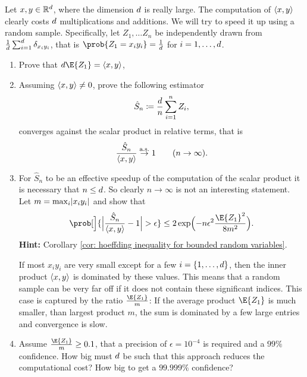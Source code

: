 
\begin{exercise}[subtitle={Randomized linear algebra \Coffeecup}]
    Let \(x,y \in \mathbb{R}^d\), where the dimension \(d\) is really large.
    The computation of \(\langle x,y\rangle\) clearly costs \(d\) multiplications and
    additions. We will try to speed it up using a random sample.
    Specifically, let \(Z_1, \ldots Z_n\) be independently drawn from
    \(\frac1{d}\sum_{i=1}^d \delta_{x_iy_i}\), that is
    \(\prob{Z_1 = x_iy_i} = \frac1\dims\) for \(i=1, \ldots, d\).
    \begin{enumerate}[label=(\alph*), noitemsep]
        \item\label{it: (randomized linear algebra) expectation}
        Prove that \(\dims \E{Z_1} = \scp{x,y}\),

        \item\label{it: (randomized linear algebra) convergence}
        Assuming \(\langle x,y\rangle \neq 0\), prove the following estimator
        \[
            \hat S_n \coloneq \frac{d}{n} \sum_{i=1}^n Z_i,
        \]
        converges against the scalar product in relative terms, that is
        \[
            \frac{\hat S_n}{\langle x,y\rangle} \overset{\operatorname{\text{a.s.}}}\to 1 \qquad (n \to \infty).
        \]

        \item\label{it: (randomized linear algebra) PAC bound}
        For \(\hat S_n\) to be an effective speedup of the
        computation of the scalar product it is necessary that \(n\le d\). So
        clearly \(n\to \infty\) is not an interesting statement.
        Let \(m = \max_i \lvert x_i y_i\rvert\) and show that
        \[
            \prob[\Big]{\abs[\Big]{\frac{\hat S_n}{\scp{x,y}} - 1} > \epsilon}
            \le 2\exp\Bigl(-n \epsilon^2 \frac{\E{Z_1}^2}{8 m^2}\Bigr).
        \]
        \textbf{Hint:} Corollary \ref{cor: hoeffding inequality for bounded random variables}.
        \begin{remark}
            If most \(x_iy_i\) are very small except for a few \(i=\{1,\dots, d\}\),
            then the inner product \(\langle x,y\rangle\) is dominated by these values.
            This means that a random sample can be very far off if it does not
            contain these significant indices. This case is captured
            by the ratio \(\frac{\E{Z_1}}{m}\): If the average product
            \(\E{Z_1}\) is much smaller, than largest product \(m\), the sum is
            dominated by a few large entries and convergence is slow.
        \end{remark}

        \item\label{it: (randomized linear algebra) sample complexity}
        Assume \(\frac{\E{Z_1}}{m} \ge 0.1\), that a precision of \(\epsilon
        = 10^{-4}\) is required and a \(99\%\) confidence. How big must
        \(d\) be such that this approach reduces the computational cost?
        How big to get a \(99.999\%\) confidence?
    \end{enumerate}
\end{exercise}

